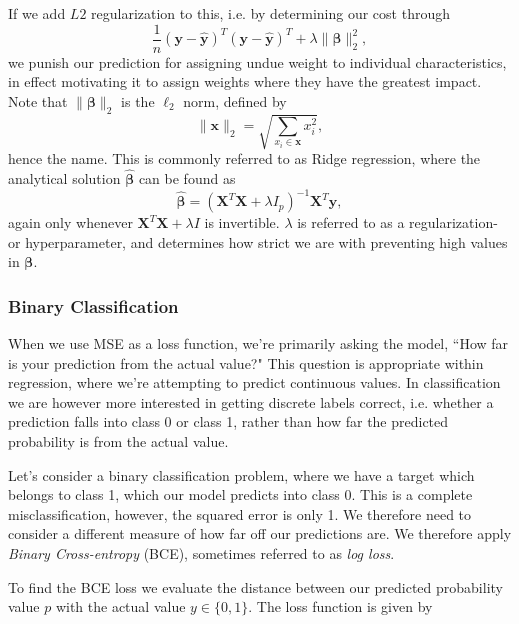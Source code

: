 \documentclass{article}
\theoremstyle{definition}
\begin{document}
If we add $L2$ regularization to this, i.e. by determining our cost through
\begin{equation*}
    \frac{1}{n} \left( \boldsymbol{y} - \hat{\boldsymbol{y}} \right)^T \left( \boldsymbol{y} - \hat{\boldsymbol{y}} \right)^T + \lambda \lVert \boldsymbol{\beta} \rVert_2^2,
\end{equation*}
we punish our prediction for assigning undue weight to individual characteristics, in effect motivating it to assign weights where they have the greatest impact. Note that $\lVert \boldsymbol{\beta} \rVert_2$ is the $\ell_2$ norm, defined by
\begin{equation*}
    \lVert \boldsymbol{x} \rVert_2 = \sqrt{\sum_{x_i \in \boldsymbol{x}} x_i^2},
\end{equation*}
hence the name. This is commonly referred to as Ridge regression, where the analytical solution $\hat{\boldsymbol{\beta}}$ can be found as
\begin{equation*}
    \hat{\boldsymbol{\beta}} = \left( \mathbf{X}^T \mathbf{X} + \lambda I_{p} \right)^{-1} \mathbf{X}^T \boldsymbol{y},
\end{equation*}
again only whenever $\mathbf{X}^T \mathbf{X} + \lambda I$ is invertible. $\lambda$ is referred to as a regularization- or hyperparameter, and determines how strict we are with preventing high values in $\boldsymbol{\beta}$.

\subsubsection{Binary Classification}
When we use MSE as a loss function, we're primarily asking the model, ``How far is your prediction from the actual value?" This question is appropriate within regression, where we're attempting to predict continuous values. In classification we are however more interested in getting discrete labels correct, i.e. whether a prediction falls into class 0 or class 1, rather than how far the predicted probability is from the actual value.

Let's consider a binary classification problem, where we have a target which belongs to class 1, which our model predicts into class 0. This is a complete misclassification, however, the squared error is only 1. We therefore need to consider a different measure of how far off our predictions are. We therefore apply \textit{Binary Cross-entropy} (BCE), sometimes referred to as \textit{log loss}.

To find the BCE loss we evaluate the distance between our predicted probability value $p$ with the actual value $y \in \{0, 1\}$. The loss function is given by
\end{document}
